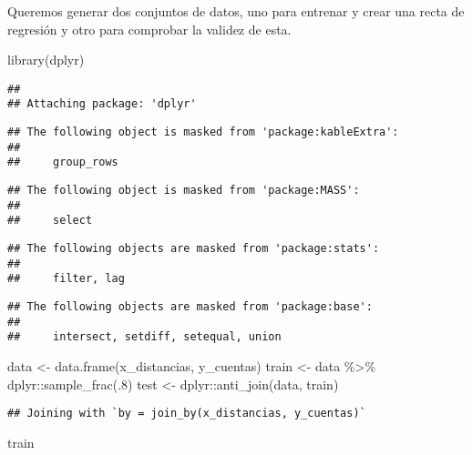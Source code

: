 \documentclass[
]{article}
\newenvironment{Shaded}{\begin{snugshade}}{\end{snugshade}}
\newcommand{\DecValTok}[1]{\textcolor[rgb]{0.00,0.00,0.81}{#1}}
\newcommand{\FunctionTok}[1]{\textcolor[rgb]{0.00,0.00,0.00}{#1}}
\newcommand{\NormalTok}[1]{#1}
\newcommand{\OtherTok}[1]{\textcolor[rgb]{0.56,0.35,0.01}{#1}}
\newcommand{\SpecialCharTok}[1]{\textcolor[rgb]{0.00,0.00,0.00}{#1}}
\begin{document}
Queremos generar dos conjuntos de datos, uno para entrenar y crear una
recta de regresión y otro para comprobar la validez de esta.

\begin{Shaded}
\begin{Highlighting}[]
\FunctionTok{library}\NormalTok{(dplyr)}
\end{Highlighting}
\end{Shaded}

\begin{verbatim}
## 
## Attaching package: 'dplyr'
\end{verbatim}

\begin{verbatim}
## The following object is masked from 'package:kableExtra':
## 
##     group_rows
\end{verbatim}

\begin{verbatim}
## The following object is masked from 'package:MASS':
## 
##     select
\end{verbatim}

\begin{verbatim}
## The following objects are masked from 'package:stats':
## 
##     filter, lag
\end{verbatim}

\begin{verbatim}
## The following objects are masked from 'package:base':
## 
##     intersect, setdiff, setequal, union
\end{verbatim}

\begin{Shaded}
\begin{Highlighting}[]
\NormalTok{data }\OtherTok{\textless{}{-}} \FunctionTok{data.frame}\NormalTok{(x\_distancias, y\_cuentas)}
\NormalTok{train }\OtherTok{\textless{}{-}}\NormalTok{ data }\SpecialCharTok{\%\textgreater{}\%}\NormalTok{ dplyr}\SpecialCharTok{::}\FunctionTok{sample\_frac}\NormalTok{(.}\DecValTok{8}\NormalTok{)}
\NormalTok{test }\OtherTok{\textless{}{-}}\NormalTok{ dplyr}\SpecialCharTok{::}\FunctionTok{anti\_join}\NormalTok{(data, train)}
\end{Highlighting}
\end{Shaded}

\begin{verbatim}
## Joining with `by = join_by(x_distancias, y_cuentas)`
\end{verbatim}

\begin{Shaded}
\begin{Highlighting}[]
\NormalTok{train}
\end{Highlighting}
\end{Shaded}
\end{document}
